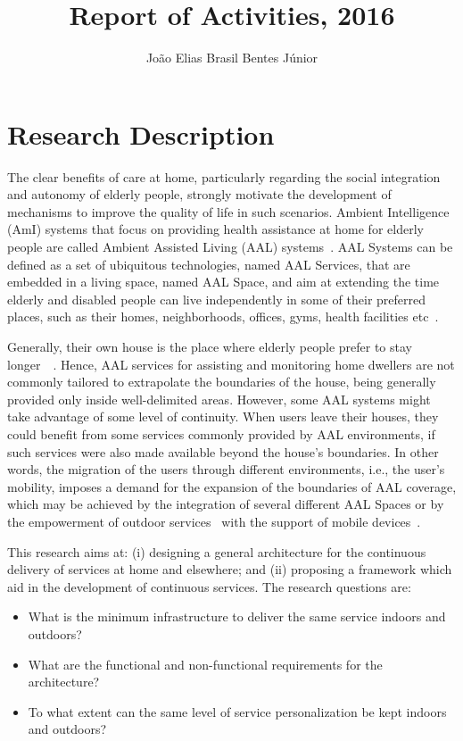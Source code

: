 \documentclass[]{report}
\title{Report of Activities, 2016}
\author{Jo\~{a}o Elias Brasil Bentes J\'{u}nior}
\begin{document}
\maketitle

\section*{Research Description} \label{research-description}

The clear benefits of care at home, particularly regarding the social integration and autonomy of elderly people, strongly motivate the development of mechanisms to improve the quality of life in such scenarios. Ambient Intelligence (AmI) systems that focus on providing health assistance at home for elderly people are called Ambient Assisted Living (AAL) systems~\cite{sun2009promises}. AAL Systems can be defined as a set of ubiquitous technologies, named AAL Services, that are embedded in a living space, named AAL Space, and aim at extending the time elderly and disabled people can live independently in some of their preferred places, such as their homes, neighborhoods, offices, gyms, health facilities etc~\cite{living2011ambient}.

Generally, their own house is the place where elderly people prefer to stay longer~\cite{aloulou2013deployment}~\cite{sixsmith2014healthy}. Hence, AAL services for assisting and monitoring home dwellers are not commonly tailored to extrapolate the boundaries of the house, being generally provided only inside well-delimited areas. However, some AAL systems might take advantage of some level of continuity. When users leave their houses, they could benefit from some services commonly provided by AAL environments, if such services were also made available beyond the house's boundaries. In other words, the migration of the users through different environments, i.e., the user's mobility, imposes a demand for the expansion of the boundaries of AAL coverage, which may be achieved by the integration of several different AAL Spaces or by the empowerment of outdoor services~\cite{Cook2009_2} with the support of mobile devices~\cite{Persona}.

This research aims at: (i) designing a general architecture for the continuous delivery of services at home and elsewhere; and (ii) proposing a framework which aid in the development of continuous services. The research questions are:
\begin{itemize}
	\item What is the minimum infrastructure to deliver the same service indoors and outdoors?
	\item What are the functional and non-functional requirements for the architecture?
	\item To what extent can the same level of service personalization be kept indoors and outdoors?
\end{itemize}
\end{document}
